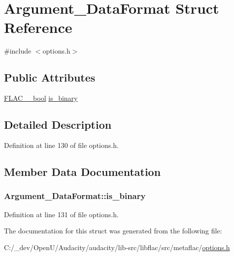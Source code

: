 \hypertarget{struct_argument___data_format}{}\section{Argument\+\_\+\+Data\+Format Struct Reference}
\label{struct_argument___data_format}


{\ttfamily \#include $<$options.\+h$>$}

\subsection*{Public Attributes}
\begin{DoxyCompactItemize}
\item 
\hyperlink{ordinals_8h_a95103469f1cbd78b8cf250194985b34e}{F\+L\+A\+C\+\_\+\+\_\+bool} \hyperlink{struct_argument___data_format_ab2bfbf38e4057778e051beba88a9ec77}{is\+\_\+binary}
\end{DoxyCompactItemize}


\subsection{Detailed Description}


Definition at line 130 of file options.\+h.



\subsection{Member Data Documentation}
\subsubsection[{\texorpdfstring{is\+\_\+binary}{is_binary}}]{ Argument\+\_\+\+Data\+Format\+::is\+\_\+binary}\hypertarget{struct_argument___data_format_ab2bfbf38e4057778e051beba88a9ec77}{}\label{struct_argument___data_format_ab2bfbf38e4057778e051beba88a9ec77}


Definition at line 131 of file options.\+h.



The documentation for this struct was generated from the following file\+:\begin{DoxyCompactItemize}
\item 
C\+:/\+\_\+dev/\+Open\+U/\+Audacity/audacity/lib-\/src/libflac/src/metaflac/\hyperlink{libflac_2src_2metaflac_2options_8h}{options.\+h}\end{DoxyCompactItemize}
